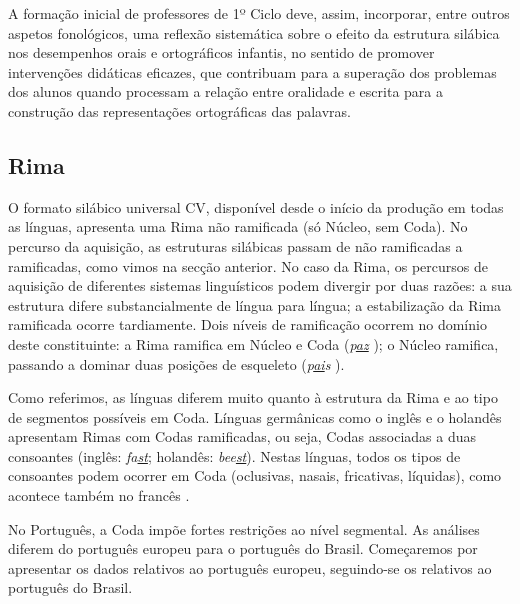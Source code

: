 \documentclass[output=paper]{LSP/langsci}
\begin{document}
A formação inicial de professores de 1º Ciclo deve, assim, incorporar, entre outros aspetos fonológicos, uma reflexão sistemática sobre o efeito da estrutura silábica nos desempenhos orais e ortográficos infantis, no sentido de promover intervenções didáticas eficazes, que contribuam para a superação dos problemas dos alunos quando processam a relação entre oralidade e escrita para a construção das representações ortográficas das palavras.

\subsection{Rima}
\label{subsec:freitas_rima}

O formato silábico universal CV, disponível desde o início da produção em todas as línguas, apresenta uma Rima não ramificada (só Núcleo, sem Coda). No percurso da aquisição, as estruturas silábicas passam de não ramificadas a ramificadas, como vimos na secção anterior. No caso da Rima, os percursos de aquisição de diferentes sistemas linguísticos podem divergir por duas razões: a sua estrutura difere substancialmente de língua para língua; a estabilização da Rima ramificada ocorre tardiamente. Dois níveis de ramificação ocorrem no domínio deste constituinte: a Rima ramifica em Núcleo e Coda (\textit{p\underline{az}} ); o Núcleo ramifica, passando a dominar duas posições de esqueleto (\textit{p\underline{ai}s} ).

Como referimos, as línguas diferem muito quanto à estrutura da Rima e ao tipo de segmentos possíveis em Coda. Línguas germânicas como o inglês e o holandês apresentam Rimas com Codas ramificadas, ou seja, Codas associadas a duas consoantes (inglês: \textit{fa\underline{st}}; holandês: \textit{bee\underline{st}}). Nestas línguas, todos os tipos de consoantes podem ocorrer em Coda (oclusivas, nasais, fricativas, líquidas), como acontece também no francês \citep{fikkert1994,bernhardtstemberger1998,rose200,almeida2011}.

No Português, a Coda impõe fortes restrições ao nível segmental. As análises diferem do português europeu para o português do Brasil. Começaremos por apresentar os dados relativos ao português europeu, seguindo-se os relativos ao português do Brasil.
\end{document}
